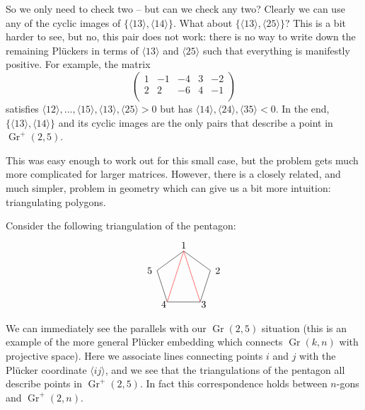 \documentclass[11pt]{article}
\DeclareMathOperator{\Gr}{Gr}
\def\ket#1{\langle #1 \rangle}
\def\drawLabeledPentagon{
\coordinate (P1) at (90:1);
\coordinate (P2) at (18:1);
\coordinate (P3) at (306:1);
\coordinate (P4) at (234:1);
\coordinate (P5) at (162:1);
\draw (P1) -- (P2) -- (P3) -- (P4) -- (P5) -- cycle;
\draw (0,1.2) node {1};
\draw (1,.3) node[anchor=west] {2};
\draw (.5,-.9) node[anchor=west] {3};
\draw (-.5,-.9) node[anchor=east] {4};
\draw (-1,.3) node[anchor=east] {5};
}
\begin{document}
So we only need to check two -- but can we check any two? Clearly we can use any of the cyclic images of $\{\ket{13}, \ket{14}\}$. What about $\{\ket{13}, \ket{25}\}$? This is a bit harder to see, but no, this pair does not work: there is no way to write down the remaining Pl\"uckers in terms of $\ket{13}$ and $\ket{25}$ such that everything is manifestly positive. For example, the matrix
\begin{equation}
\left(
\begin{array}{ccccc}
 1 & -1 & -4 & 3 & -2 \\
 2 & 2 & -6 & 4 & -1 \\
\end{array}
\right)
\end{equation}
satisfies $\ket{12},\ldots,\ket{15},\ket{13},\ket{25}>0$ but has $\ket{14},\ket{24},\ket{35}<0$. In the end, $\{\ket{13}, \ket{14}\}$ and its cyclic images are the only pairs that describe a point in $\Gr^+(2,5)$. 

This was easy enough to work out for this small case, but the problem gets much more complicated for larger matrices. However, there is a closely related, and much simpler, problem in geometry which can give us a bit more intuition: triangulating polygons.

Consider the following triangulation of the pentagon:
\begin{equation}
\begin{tikzpicture}
  \drawLabeledPentagon
  \draw[color=red] (P1) -- (P3);
  \draw[color=red] (P1) -- (P4);
\end{tikzpicture}
\end{equation}
We can immediately see the parallels with our $\Gr(2,5)$ situation (this is an example of the more general Pl\"ucker embedding which connects $\Gr(k,n)$ with projective space). Here we associate lines connecting points $i$ and $j$ with the Pl\"ucker coordinate $\ket{ij}$, and we see that the triangulations of the pentagon all describe points in $\Gr^+(2,5)$. In fact this correspondence holds between $n$-gons and $\Gr^+(2,n)$. 
\end{document}

